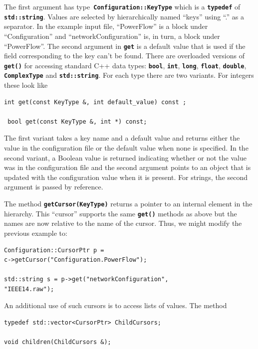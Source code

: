 \documentclass[12pt]{report} %
\begin{document}
The first argument has type\texttt{\textbf{ Configuration::KeyType}} which is a \texttt{\textbf{typedef}} of \texttt{\textbf{std::string}}. Values are selected by hierarchically named ``keys'' using ``.'' as a separator. In the example input file, ``PowerFlow'' is a block under ``Configuration'' and ``networkConfiguration'' is, in turn, a block under ``PowerFlow''. The second argument in \texttt{\textbf{get}} is a default value that is used if the field corresponding to the key can't be found. There are overloaded versions of \texttt{\textbf{get()}} for accessing standard C++ data types: \texttt{\textbf{bool}}, \texttt{\textbf{int}}, \texttt{\textbf{long}}, \texttt{\textbf{float}}, \texttt{\textbf{double}}, \texttt{\textbf{ComplexType}} and \texttt{\textbf{std::string}}. For each type there are two variants. For integers these look like 

{
\color{red}
\begin{Verbatim}[fontseries=b]
 int get(const KeyType &, int default_value) const ;

 bool get(const KeyType &, int *) const;
\end{Verbatim}
}

The first variant takes a key name and a default value and returns either the value in the configuration file or the default value when none is specified. In the second variant, a Boolean value is returned indicating whether or not the value was in the configuration file and the second argument points to an object that is updated with the configuration value when it is present.  For strings, the second argument is passed by reference.  

The method \texttt{\textbf{getCursor(KeyType)}} returns a pointer to an internal element in the hierarchy. This ``cursor'' supports the same \texttt{\textbf{get()}} methods as above but the names are now relative to the name of the  cursor. Thus, we might modify the previous example to:

{
\color{red}
\begin{Verbatim}[fontseries=b]
Configuration::CursorPtr p = 
c->getCursor("Configuration.PowerFlow");

std::string s = p->get("networkConfiguration", 
"IEEE14.raw");
\end{Verbatim}
}

An additional use of such cursors is to access lists of values. The method 

{
\color{red}
\begin{Verbatim}[fontseries=b]
typedef std::vector<CursorPtr> ChildCursors;

void children(ChildCursors &);
\end{Verbatim}
}
\end{document}
